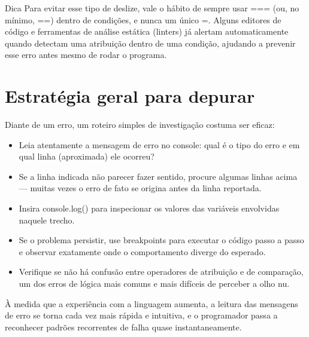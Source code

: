 \begin{infobox}{Dica}
Para evitar esse tipo de deslize, vale o hábito de sempre usar === (ou, no mínimo, ==) dentro de condições, e nunca um único =. Alguns editores de código e ferramentas de análise estática (linters) já alertam automaticamente quando detectam uma atribuição dentro de uma condição, ajudando a prevenir esse erro antes mesmo de rodar o programa.
\end{infobox}

\section{Estratégia geral para depurar}

Diante de um erro, um roteiro simples de investigação costuma ser eficaz:

\begin{itemize}
  \item Leia atentamente a mensagem de erro no console: qual é o tipo do erro e em qual linha (aproximada) ele ocorreu?
\end{itemize}

\begin{itemize}
  \item Se a linha indicada não parecer fazer sentido, procure algumas linhas acima — muitas vezes o erro de fato se origina antes da linha reportada.
\end{itemize}

\begin{itemize}
  \item Insira console.log() para inspecionar os valores das variáveis envolvidas naquele trecho.
\end{itemize}

\begin{itemize}
  \item Se o problema persistir, use breakpoints para executar o código passo a passo e observar exatamente onde o comportamento diverge do esperado.
\end{itemize}

\begin{itemize}
  \item Verifique se não há confusão entre operadores de atribuição e de comparação, um dos erros de lógica mais comuns e mais difíceis de perceber a olho nu.
\end{itemize}

À medida que a experiência com a linguagem aumenta, a leitura das mensagens de erro se torna cada vez mais rápida e intuitiva, e o programador passa a reconhecer padrões recorrentes de falha quase instantaneamente.

